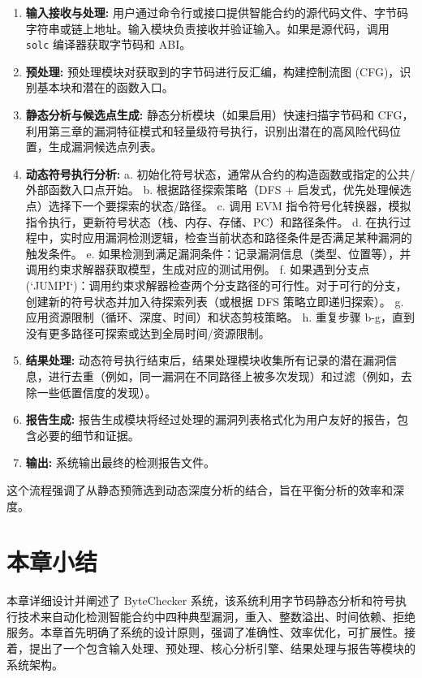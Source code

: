 \documentclass[print, master, vlined, timesmath]{DissertUESTC}
\begin{document}
\begin{enumerate}
    \item \textbf{输入接收与处理:} 用户通过命令行或接口提供智能合约的源代码文件、字节码字符串或链上地址。输入模块负责接收并验证输入。如果是源代码，调用 \texttt{solc} 编译器获取字节码和 ABI。
    \item \textbf{预处理:} 预处理模块对获取到的字节码进行反汇编，构建控制流图 (CFG)，识别基本块和潜在的函数入口。
    \item \textbf{静态分析与候选点生成:} 静态分析模块（如果启用）快速扫描字节码和 CFG，利用第三章的漏洞特征模式和轻量级符号执行，识别出潜在的高风险代码位置，生成漏洞候选点列表。
    \item \textbf{动态符号执行分析:}
        a.  初始化符号状态，通常从合约的构造函数或指定的公共/外部函数入口点开始。
        b.  根据路径探索策略（DFS + 启发式，优先处理候选点）选择下一个要探索的状态/路径。
        c.  调用 EVM 指令符号化转换器，模拟指令执行，更新符号状态（栈、内存、存储、PC）和路径条件。
        d.  在执行过程中，实时应用漏洞检测逻辑，检查当前状态和路径条件是否满足某种漏洞的触发条件。
        e.  如果检测到满足漏洞条件：记录漏洞信息（类型、位置等），并调用约束求解器获取模型，生成对应的测试用例。
        f.  如果遇到分支点 (`JUMPI`)：调用约束求解器检查两个分支路径的可行性。对于可行的分支，创建新的符号状态并加入待探索列表（或根据 DFS 策略立即递归探索）。
        g.  应用资源限制（循环、深度、时间）和状态剪枝策略。
        h.  重复步骤 b-g，直到没有更多路径可探索或达到全局时间/资源限制。
    \item \textbf{结果处理:} 动态符号执行结束后，结果处理模块收集所有记录的潜在漏洞信息，进行去重（例如，同一漏洞在不同路径上被多次发现）和过滤（例如，去除一些低置信度的发现）。
    \item \textbf{报告生成:} 报告生成模块将经过处理的漏洞列表格式化为用户友好的报告，包含必要的细节和证据。
    \item \textbf{输出:} 系统输出最终的检测报告文件。
\end{enumerate}

这个流程强调了从静态预筛选到动态深度分析的结合，旨在平衡分析的效率和深度。

\section{本章小结}


本章详细设计并阐述了 ByteChecker 系统，该系统利用字节码静态分析和符号执行技术来自动化检测智能合约中四种典型漏洞，重入、整数溢出、时间依赖、拒绝服务。本章首先明确了系统的设计原则，强调了准确性、效率优化，可扩展性。接着，提出了一个包含输入处理、预处理、核心分析引擎、结果处理与报告等模块的系统架构。
\end{document}

